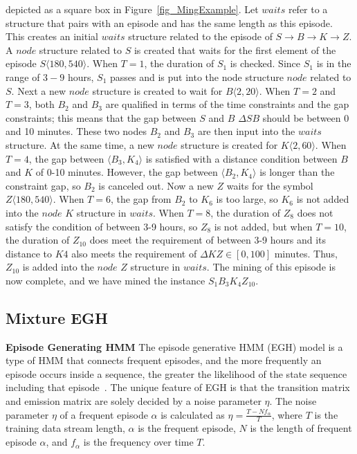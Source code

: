  depicted as a square box in Figure~\ref{fig_MingExample}.  
Let $waits$ refer to a structure that pairs with an episode 
and has the same length as this episode. 
This creates an initial $waits$ structure related to the episode of $S\rightarrow B \rightarrow K\rightarrow Z$. 
A $node$ structure related to $S$ is created that waits for the first 
element of the episode $S\langle 180, 540 \rangle $. 
When $T=1$, the duration of $S_1$ is checked. 
Since $S_1$ is in the range of $3-9$ hours, 
$S_1$ passes and is put into the node structure $node$ related to $S$. 
Next a new $node$ structure is created to wait for $B\langle 2, 20 \rangle $. 
When $T=2$ and $T=3$, both $B_2$ and $B_3$ 
are qualified in terms of the time constraints and 
the gap constraints; 
this means that the gap between $S$ and $B$ $\Delta SB$ should 
be between 0 and 10 minutes. 
These two nodes $B_2$ and $B_3$ are then input into the 
$waits$ structure. 
At the same time, 
a new $node$ structure is created for $K\langle 2, 60 \rangle $. 
When $T=4$, the gap between $\langle B_3, K_4 \rangle$ 
is satisfied with a distance condition between 
$B$ and $K$ of 0-10 minutes. 
However, the gap between $\langle B_2, K_4 \rangle$ 
is longer than the constraint gap, so $B_2$ is canceled out. 
Now a new $Z$ waits for the symbol $Z\langle 180, 540 \rangle$. 
When $T=6$, the gap from $B_2$ to $K_6$ is 
too large, so $K_6$ is not added into the $node$ $K$ structure in $waits$.
When $T=8$, the duration of $Z_8$ does not satisfy the condition of between 3-9 hours,  
so $Z_8$ is not added, 
but when $T=10$, the duration of $Z_{10}$ does meet the requirement of between 3-9 hours 
and its distance to $K4$ also meets the requirement 
of $\Delta KZ \in [0,100]$ minutes. 
Thus, $Z_{10}$ is added into the $node$ $Z$ structure in $waits$.
The mining of this episode is now complete, and 
we have mined the instance $S_1B_3K_4Z_{10}$. 


\subsection{Mixture EGH}
\textbf{Episode Generating HMM}
The episode generative HMM (EGH) model is a 
type of HMM that connects frequent episodes, 
and the more frequently an episode occurs inside a sequence, 
the greater the likelihood of the state sequence including that episode~\cite{laxman2008stream}.  
The unique feature of EGH is that 
the transition matrix and 
emission matrix are solely decided by a noise parameter $\eta$. 
The noise parameter $\eta$ of a frequent episode $\alpha$ 
is calculated as $\eta=\frac{T-Nf_{\alpha}}{T}$,  
where $T$ is the training data stream length, 
$\alpha$ is the frequent episode, 
$N$ is the length of frequent episode $\alpha$, 
and $f_{\alpha}$ is the frequency over time $T$.

